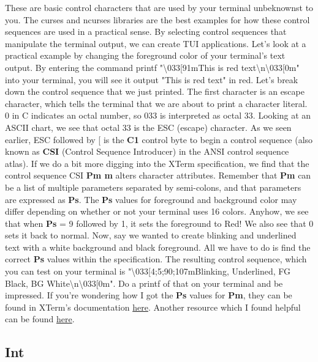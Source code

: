 \documentclass{article}
\begin{document}
These are basic control characters that are used by your terminal unbeknownst to you. The curses and ncurses
libraries are the best examples for how these control sequences are used in a practical sense. By selecting
control sequences that manipulate the terminal output, we can create TUI applications. Let’s look at a
practical example by changing the foreground color of your terminal’s text output. By entering the command
printf "\textbackslash{}033[91mThis is red text\textbackslash{}n\textbackslash{}033[0m" into your terminal,
you will see it output "This is red text" in red. Let’s break down the control sequence that we just printed.
The first character is an escape character, which tells the terminal that we are about to print a character
literal. 0 in C indicates an octal number, so 033 is interpreted as octal 33. Looking at an ASCII chart, we
see that octal 33 is the ESC (escape) character. As we seen earlier, ESC followed by [ is the \textbf{C1}
control byte to begin a control sequence (also known as \textbf{CSI} (Control Sequence Introducer) in the ANSI
control sequence atlas). If we do a bit more digging into the XTerm specification, we find that the control
sequence CSI \textbf{Pm m} alters character attributes. Remember that \textbf{Pm} can be a list of multiple
parameters separated by semi-colons, and that parameters are expressed as \textbf{Ps}. The \textbf{Ps} values
for foreground and background color may differ depending on whether or not your terminal uses 16 colors.
Anyhow, we see that when \textbf{Ps} = 9 followed by 1, it sets the foreground to Red! We also see that 0 sets
it back to normal. Now, say we wanted to create blinking and underlined text with a white background and black
foreground. All we have to do is find the correct \textbf{Ps} values within the specification. The resulting
control sequence, which you can test on your terminal is "\textbackslash{}033[4;5;90;107mBlinking, Underlined,
FG Black, BG White\textbackslash{}n\textbackslash{}033[0m". Do a printf of that on your terminal and be
impressed. If you’re wondering how I got the \textbf{Ps} values for \textbf{Pm}, they can be found in XTerm’s
documentation
\href{https://invisible-island.net/xterm/ctlseqs/ctlseqs.html\#h3-Application-Program-Command-functions}{here}.
Another resource which I found helpful can be found
\href{https://www.aivosto.com/articles/control-characters.html}{here}.

\subsection{Int}
\end{document}
